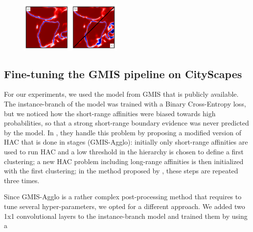 \begin{figure}[b]
\centering
        \includegraphics[width=0.45\textwidth,trim=0.1in 0.0in 0.05in 0.0in,clip]{figs/noisy_affs_comparison.png}
   
    \label{fig:noisy_affs}
\end{figure}

\subsection{Fine-tuning the GMIS pipeline on CityScapes} \label{sec:appendix_cityscapes}
For our experiments, we used the model from GMIS \cite{liu2018affinity} that is publicly available. The instance-branch of the model was trained with a Binary Cross-Entropy loss, but we noticed how the short-range affinities were biased towards high probabilities, so that a strong short-range boundary evidence was never predicted by the model. In \cite{liu2018affinity}, they handle this problem by proposing a modified version of HAC that is done in stages (GMIS-Agglo): initially only short-range affinities are used to run HAC and a low threshold in the hierarchy is chosen to define a first clustering; a new HAC problem including long-range affinities is then initialized with the first clustering; in the method proposed by \cite{liu2018affinity}, these steps are repeated three times. 

Since GMIS-Agglo is a rather complex post-processing method that requires to tune several hyper-parameters, we opted for a different approach. We added two 1x1 convolutional layers to the instance-branch model and trained them by using a 



